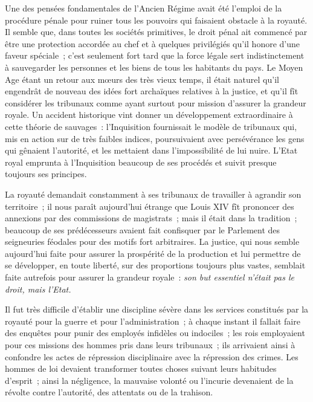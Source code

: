 \documentclass[french,twoside]{book} %
\begin{document}
Une des pensées fondamentales de l’Ancien Régime avait été l’emploi de la procédure pénale pour ruiner tous les pouvoirs qui faisaient obstacle à la royauté. Il semble que, dans toutes les sociétés primitives, le droit pénal ait commencé par être une protection accordée au chef et à quelques privilégiés qu’il honore d’une faveur spéciale ; c’est seulement fort tard que la force légale sert indistinctement à sauvegarder les personnes et les biens de tous les habitants du pays. Le Moyen Age étant un retour aux mœurs des très vieux temps, il était naturel qu’il engendrât de nouveau des idées fort archaïques relatives à la justice, et qu’il fît considérer les tribunaux comme ayant surtout pour mission d’assurer la grandeur royale. Un accident historique vint donner un développement extraordinaire à cette théorie de sauvages : l’Inquisition fournissait le modèle de tribunaux qui, mis en action sur de très faibles indices, poursuivaient avec persévérance les gens qui gênaient l’autorité, et les mettaient dans l’impossibilité de lui nuire. L’Etat royal emprunta à l’Inquisition beaucoup de ses procédés et suivit presque toujours ses principes.\par
La royauté demandait constamment à ses tribunaux de travailler à agrandir son territoire ; il nous paraît aujourd’hui étrange que Louis XIV fît prononcer des annexions par des commissions de magistrats ; mais il  était dans la tradition ; beaucoup de ses prédécesseurs avaient fait confisquer par le Parlement des seigneuries féodales pour des motifs fort arbitraires. La justice, qui nous semble aujourd’hui faite pour assurer la prospérité de la production et lui permettre de se développer, en toute liberté, sur des proportions toujours plus vastes, semblait faite autrefois pour assurer la grandeur royale : \emph{son but essentiel n’était pas le droit, mais l’Etat.}\par
Il fut très difficile d’établir une discipline sévère dans les services constitués par la royauté pour la guerre et pour l’administration ; à chaque instant il fallait faire des enquêtes pour punir des employés infidèles ou indociles ; les rois employaient pour ces missions des hommes pris dans leurs tribunaux ; ils arrivaient ainsi à confondre les actes de répression disciplinaire avec la répression des crimes. Les hommes de loi devaient transformer toutes choses suivant leurs habitudes d’esprit ; ainsi la négligence, la mauvaise volonté ou l’incurie devenaient de la révolte contre l’autorité, des attentats ou de la trahison.\par
\end{document}
